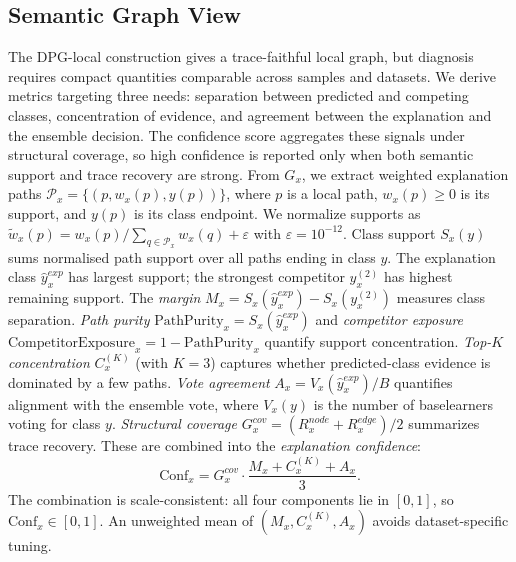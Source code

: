 \documentclass[runningheads]{llncs}
\begin{document}
\subsection{Semantic Graph View} \label{sec:semantic-layer}
The DPG-local construction gives a trace-faithful local graph, but diagnosis requires compact quantities comparable across samples and datasets. We derive metrics targeting three needs: separation between predicted and competing classes, concentration of evidence, and agreement between the explanation and the ensemble decision. The confidence score aggregates these signals under structural coverage, so high confidence is reported only when both semantic support and trace recovery are strong.
From $G_x$, we extract weighted explanation paths $\mathcal{P}_x=\{(p,w_x(p),y(p))\}$, where $p$ is a local path, $w_x(p)\ge 0$ is its support, and $y(p)$ is its class endpoint. We normalize supports as $\tilde{w}_x(p)={w_x(p)}/{\sum_{q\in\mathcal{P}_x} w_x(q)+\varepsilon}$ with $\varepsilon=10^{-12}$. Class support $S_x(y)$ sums normalised path support over all paths ending in class $y$. The explanation class $\hat{y}^{exp}_x$ has largest support; the strongest competitor $y_x^{(2)}$ has highest remaining support.
The \emph{margin} $M_x=S_x(\hat{y}^{exp}_x)-S_x(y_x^{(2)})$ measures class separation. \emph{Path purity} $\mathrm{PathPurity}_x=S_x(\hat{y}^{exp}_x)$ and \emph{competitor exposure} $\mathrm{CompetitorExposure}_x=1-\mathrm{PathPurity}_x$ quantify support concentration.
\emph{Top-$K$ concentration} $C_x^{(K)}$ (with $K=3$) captures whether predicted-class evidence is dominated by a few paths. \emph{Vote agreement} $A_x=V_x(\hat{y}^{exp}_x)/B$ quantifies alignment with the ensemble vote, where $V_x(y)$ is the number of baselearners voting for class $y$. \emph{Structural coverage} $G_x^{cov}=(R_x^{node}+R_x^{edge})/2$ summarizes trace recovery.
These are combined into the \emph{explanation confidence}:
\[
\mathrm{Conf}_x=G_x^{cov}\cdot\frac{M_x+C_x^{(K)}+A_x}{3}.
\]
The combination is scale-consistent: all four components lie in $[0,1]$, so $\mathrm{Conf}_x\in[0,1]$.
An unweighted mean of $(M_x,C_x^{(K)},A_x)$ avoids dataset-specific tuning.
\end{document}
